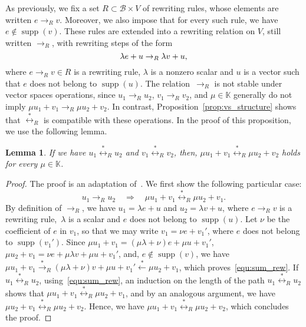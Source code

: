 \documentclass[11pt]{article}
\newtheorem{lemma}[theorem]{Lemma}
\theoremstyle{definition}
\newcommand\basis{\mathscr{B}}
\DeclareMathOperator{\supp}{supp}
\newcommand\K{\mathbb{K}}
\newcommand\rewR{\to_R}
\newcommand\transR{\overset{*}{\to}_R}
\newcommand\equivR{\overset{*}{\leftrightarrow}_R}
\begin{document}
As previously, we fix a set $R\subset\basis\times V$ of rewriting rules,
whose elements are written $e\rewR v$. Moreover, we also impose that for
every such rule, we have $e\notin\supp(v)$. These rules are extended into
a rewriting relation on $V$, still written $\rewR$, with rewriting steps
of the form
\begin{equation*}\label{equ:R_rewriting_step}
  \lambda e+u\rewR\lambda v+u,
  \smallskip
\end{equation*}
where $e\rewR v\in R$ is a rewriting rule, $\lambda$ is a nonzero scalar
and $u$ is a vector such that $e$ does not belong to $\supp(u)$. The
relation~$\rewR$ is not stable under vector spaces operations, since
$u_1\rewR u_2$, $v_1\rewR v_2$, and $\mu\in\K$ generally do not imply
$\mu u_1+v_1\rewR \mu u_2+v_2$. In contrast,
Proposition~\ref{prop:vs_structure} shows that $\equivR$ is compatible
with these operations. In the proof of this proposition, we use the
following lemma.
\smallskip

\begin{lemma}\label{lem:butterfly}
  If we have $u_1\equivR u_2$ and $v_1\equivR v_2$, then,
  $\mu u_1+v_1\equivR\mu u_2+v_2$ holds for every $\mu\in\K$.
\end{lemma}

\begin{proof}
  The proof is an adaptation
  of~\cite[Lemma 3.1.3]{GuiraudHoffbeckMalbos19}. We first show the
  following particular case:
  \begin{equation}\label{equ:sum_rew}
    u_1\rewR u_2\quad\Rightarrow\quad\mu u_1+v_1\equivR\mu u_2+v_1.
  \end{equation}
  By
  definition of $\rewR$, we have $u_1=\lambda e+u$ and $u_2=\lambda v+u$,
  where $e\rewR v$ is a rewriting rule,~$\lambda$ is a scalar and $e$
  does not belong to $\supp(u)$. Let $\nu$ be the coefficient of $e$ in
  $v_1$, so that we may write $v_1=\nu e+v_1'$, where $e$ does not belong
  to $\supp(v_1')$. Since $\mu u_1+v_1=(\mu\lambda+\nu)e+\mu u+v_1'$,
  $\mu u_2+v_1=\nu e+\mu\lambda v +\mu u+v_1'$, and, $e\notin\supp(v)$,
  we have $\mu u_1+v_1\transR(\mu\lambda+\nu)v+\mu u+v_1'
  \overset{*}{\leftarrow}\mu u_2+v_1$, which proves~\eqref{equ:sum_rew}.
  If $u_1\equivR u_2$, using~\eqref{equ:sum_rew}, an induction on the
  length of the path $u_1\equivR u_2$ shows that
  $\mu u_1+v_1\equivR\mu u_2+v_1$, and by an analogous argument, we have
  $\mu u_2+v_1\equivR\mu u_2+v_2$. Hence, we have
  $\mu u_1+v_1\equivR\mu u_2+v_2$, which concludes the proof.
\end{proof}
\smallskip
\end{document}
